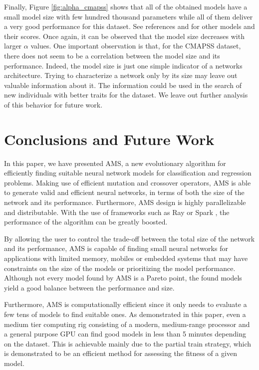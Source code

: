 \documentclass[12pt]{elsart}%
\begin{document}
Finally, Figure \ref{fig:alpha_cmapss} shows that all of the obtained models have a small model size with few hundred thousand parameters while all of them deliver a very good performance for this dataset. See references \cite{Laredo2018} and \cite{Li2018} for other models and their scores. Once again, it can be observed that the model size decreases with larger $\alpha$ values. One important observation is that, for the CMAPSS dataset, there does not seem to be a correlation between the model size and its performance. Indeed, the model size is just one simple indicator of a networks architecture. Trying to characterize a network only by its size may leave out valuable information about it. The information could be used in the search of new individuals with better traits for the dataset. We leave out further analysis of this behavior for future work.

\section{Conclusions and Future Work}
\label{sec:conclusions}

In this paper, we have presented AMS, a new evolutionary algorithm for efficiently finding suitable neural network models for classification and regression problems. Making use of efficient mutation and crossover operators, AMS is able to generate valid and efficient neural networks, in terms of both the size of the network and its performance. Furthermore, AMS design is highly parallelizable and distributable. With the use of frameworks such as Ray \cite{Moritz2017} or Spark \cite{Zaharia2010}, the performance of the algorithm can be greatly boosted.

By allowing the user to control the trade-off between the total size of the network and its performance, AMS is capable of finding small neural networks for applications with limited memory, mobiles or embedded systems that may have constraints on the size of the models or prioritizing the model performance. Although not every model found by AMS is a Pareto point, the found models yield a good balance between the performance and size.

Furthermore, AMS is computationally efficient since it only needs to evaluate a few tens of models to find suitable ones. As demonstrated in this paper, even a medium tier computing rig consisting of a modern, medium-range processor and a general purpose GPU can find good models in less than 5 minutes depending on the dataset. This is achievable mainly due to the partial train strategy, which is demonstrated to be an efficient method for assessing the fitness of a given model.
\end{document}
